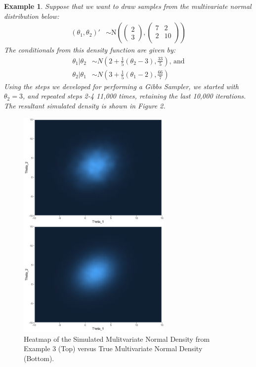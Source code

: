 \documentclass[10pt]{article}
\newtheorem{example}{Example}
\begin{document}
\begin{example}
    Suppose that we want to draw samples from the multivariate normal distribution below:
    \begin{align*}
        \left( \theta_{1}, \theta_{2} \right)' &\sim \text{N} \left(
        \begin{pmatrix} 2 \\
                        3 \end{pmatrix}, 
        \begin{pmatrix} 7 & 2 \\
                        2 & 10 \\ \end{pmatrix} \right)
    \end{align*}
    The conditionals from this density function are given by:
    \begin{align*}
        \theta_{1} | \theta_{2} &\sim N \left( 2 + \frac{1}{5} \left( \theta_{2} - 3 \right), \frac{33}{5} \right) \text{, and} \\[1em]
        \theta_{2} | \theta_{1} &\sim N \left( 3 + \frac{1}{5} \left( \theta_{1} - 2 \right), \frac{66}{7} \right)
    \end{align*}
    \noindent
    Using the steps we developed for performing a Gibbs Sampler, we started with $\theta_{2} = 3$, and repeated steps 2-4 11,000 times, retaining the last 10,000 iterations. The resultant simulated density is shown in Figure 2.
\end{example}

\begin{figure}
    \centering
    \includegraphics[width=75mm,scale=0.5]{Figure2.png}
    \caption{Heatmap of the Simulated Mulitvariate Normal Density from Example 3 (Top) versus True Multivariate Normal Density (Bottom).} 
    \label{fig:my_label}
\end{figure}
\end{document}

